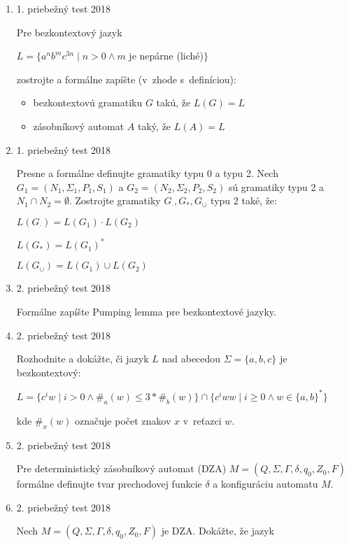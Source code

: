 \documentclass[]{article}
\begin{document}
	\begin{enumerate}
		\item 1. priebežný test 2018
		
		Pre bezkontextový jazyk
		
		$L = \{a^nb^mc^{3n} \mid n > 0 \land m$ je nepárne (liché)$\}$
		
		zostrojte a formálne zapíšte (v~zhode s~definíciou):
		\begin{itemize}
			\item bezkontextovú gramatiku $G$ takú, že $L(G) = L$
			\item zásobníkový automat $A$ taký, že $L(A) = L$
		\end{itemize}
		
		\item 1. priebežný test 2018
		
		Presne a formálne definujte gramatiky typu 0 a typu 2. Nech $G_1 = (N_1, \Sigma_1, P_1, S_1)$ a $G_2 = (N_2, \Sigma_2, P_2, S_2)$ sú gramatiky typu 2 a $N_1 \cap N_2 = \emptyset$. Zostrojte gramatiky $G_{\cdot}, G_*, G_{\cup}$ typu 2 také, že:
		
		$L(G_{\cdot}) = L(G_1) \cdot L(G_2)$
		
		$L(G_{*}) = L(G_1)^*$
		
		$L(G_{\cup}) = L(G_1) \cup L(G_2)$
		
		\item 2. priebežný test 2018
		
		Formálne zapíšte Pumping lemma pre bezkontextové jazyky.
		
		\item 2. priebežný test 2018
		
		Rozhodnite a dokážte, či jazyk $L$ nad abecedou $\Sigma = \{a,b,c\}$ je bezkontextový:
		
		$L = \{c^iw \mid i > 0 \land \#_a(w) \leq 3 * \#_b(w)\} \cap \{c^iww \mid i \geq 0 \land w \in \{a,b\}^*\}$
		
		kde $\#_x(w)$ označuje počet znakov $x$ v~reťazci $w$.
		
		\item 2. priebežný test 2018
		
		Pre deterministický zásobníkový automat (DZA) $M = (Q, \Sigma, \Gamma, \delta, q_0, Z_0, F)$ formálne definujte tvar prechodovej funkcie $\delta$ a konfiguráciu automatu $M$.
		
		\item 2. priebežný test 2018
		
		Nech $M = (Q, \Sigma, \Gamma, \delta, q_0, Z_0, F)$ je DZA. Dokážte, že jazyk
		

\end{enumerate}
\end{document}
